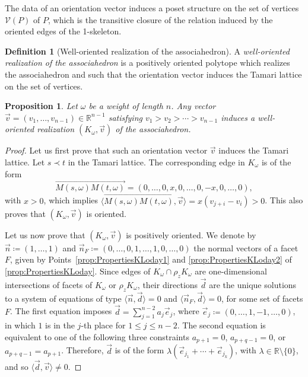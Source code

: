 \documentclass[10pt,a4paper]{amsart}
\numberwithin{equation}{section}\providecommand{\No}{}
\let\mathcal\mathscr
\theoremstyle{plain}
\newtheorem{proposition}{Proposition}
\theoremstyle{definition}
\newtheorem{definition}{Definition}
\newcommand{\RR}{\mathbb{R}}
\newcommand{\K}{{K}}
\newcommand{\ang}[1]{\langle #1\rangle}
\newcommand{\Ve}{\mathcal{V}}
\begin{document}
The data of an orientation vector induces a poset structure on the set of vertices $\Ve(P)$ of $P$, which is the transitive closure of the relation induced by the oriented edges of the 1-skeleton.

\begin{definition}[Well-oriented realization of the associahedron]
A \emph{well-oriented reali\-zation of the associahedron} is a positively oriented polytope which realizes the associahedron and such that the orientation vector induces the Tamari lattice on the set of vertices.
\end{definition}

\begin{proposition}\label{prop:OrientationVector}
Let $\omega$ be a weight of length $n$.
Any vector $\vec v=(v_1, \ldots, v_{n-1})\in \RR^{n-1}$ satisfying $v_1>v_2>\cdots >v_{n-1}$ induces a
well-oriented realization $(\K_\omega, \vec v)$ of the associahedron.
\end{proposition}

\begin{proof}
Let us first prove that such an orientation vector $\vec v$ induces the Tamari lattice.
Let $s\prec t$ in the Tamari lattice. The corresponding edge in $\K_\omega$ is of the form
\[\overrightarrow{M(s,\omega)M(t,\omega)}=(0, \ldots, 0, x, 0, \ldots, 0, -x, 0, \ldots, 0), \]
with $x>0$, which implies
$\big\langle\overrightarrow{M(s,\omega)M(t,\omega)}, \vec v\big\rangle= x(v_{j+i}-v_i)>0$.
This also proves that $(K_\omega,\vec v)$ is oriented.

Let us now prove that $(\K_\omega,\vec v)$ is positively oriented.
We denote by $\vec n\coloneqq (1, \ldots, 1)$ and $\vec n_F\coloneqq (0, \ldots, 0,\allowbreak {1}, \ldots, {1}, 0, \ldots, 0)$ the normal vectors of a facet $F$, given by Points~\eqref{prop:PropertiesKLoday1} and \eqref{prop:PropertiesKLoday2} of \cref{prop:PropertiesKLoday}.
Since edges of $\K_\omega\cap \rho_z \K_\omega$
are one-dimensional intersections of facets of
$\K_\omega$ or $\rho_z \K_\omega$, their directions $\vec d$ are the unique solutions to a system of equations of type $\langle \vec n, \vec d\rangle=0$ and $\langle \vec n_F, \vec d\rangle=0$, for some set of facets $F$.
The first equation imposes $\vec d=\sum_{j=1}^{n-2} a_j \vec e_j$, where
$\vec e_j\coloneqq (0, \ldots, 1, -1, \ldots, 0)$, in which $1$ is in the $j$-th place for $1\leq j\leq n-2$.
The second equation is equivalent to one of the following three constraints
$a_{p+1}=0$, $a_{p+q-1}=0$, or $a_{p+q-1}=a_{p+1}$.
Therefore, $\vec d$ is of the form $\lambda\left(\vec e_{j_1}+\cdots +\vec e_{j_k}\right)$, with $\lambda \in \RR\setminus \{0\}$, and so
$\ang{\vec d, \vec v}\neq 0$.
\end{proof}
\end{document}
